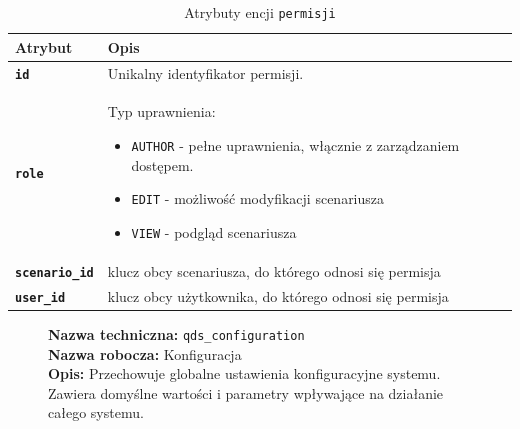 \begin{table}[H]
    \centering
    \renewcommand{\arraystretch}{1.6}
    \begin{tabular}{|>{\bfseries}l|p{}|}
        \hline
        \rowcolor[HTML]{EFEFEF} \textbf{Atrybut} & \textbf{Opis} \\
        \hline
        \texttt{id} & Unikalny identyfikator permisji. \\
        \hline
        \texttt{role} & Typ uprawnienia:
        \begin{itemize}
            \item \texttt{AUTHOR} - pełne uprawnienia, włącznie z zarządzaniem dostępem.
            \item \texttt{EDIT} - możliwość modyfikacji scenariusza
            \item \texttt{VIEW} - podgląd scenariusza
        \end{itemize} \\
        \hline
        \texttt{scenario\_id} & klucz obcy scenariusza, do którego odnosi się permisja \\
        \hline
        \texttt{user\_id} & klucz obcy użytkownika, do którego odnosi się permisja \\
        \hline
    \end{tabular}
    \caption{Atrybuty encji \texttt{permisji}}
\end{table}

\begin{figure}[H]
    \centering
    \begin{minipage}{0.8\textwidth} 
        \begin{framed}
            \noindent\textbf{\large Nazwa techniczna:} \texttt{qds\_configuration} \\
            \textbf{\large Nazwa robocza:} Konfiguracja \\
            \textbf{\large Opis:} Przechowuje globalne ustawienia konfiguracyjne systemu. Zawiera domyślne wartości 
            i parametry wpływające na działanie całego systemu.
        \end{framed}
    \end{minipage}
\end{figure}

